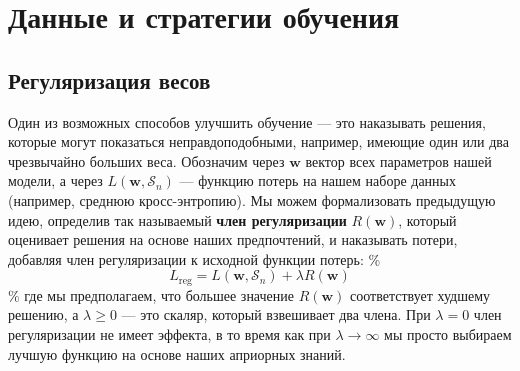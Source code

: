 \section{Данные и стратегии обучения}

\subsection{Регуляризация весов}

Один из возможных способов улучшить обучение — это наказывать решения, которые могут показаться неправдоподобными, например, имеющие один или два чрезвычайно больших веса. Обозначим через $\mathbf{w}$ вектор всех параметров нашей модели, а через $L(\mathbf{w}, \mathcal{S}_n)$ — функцию потерь на нашем наборе данных (например, среднюю кросс-энтропию). Мы можем формализовать предыдущую идею, определив так называемый \textbf{член регуляризации} $R(\mathbf{w})$, который оценивает решения на основе наших предпочтений, и наказывать потери, добавляя член регуляризации к исходной функции потерь:
\%
$$
L_{\text{reg}}=L(\mathbf{w}, \mathcal{S}_n)+\lambda R(\mathbf{w})
$$
\%
где мы предполагаем, что большее значение $R(\mathbf{w})$ соответствует худшему решению, а $\lambda \ge 0$ — это скаляр, который взвешивает два члена. При $\lambda=0$ член регуляризации не имеет эффекта, в то время как при $\lambda \rightarrow \infty$ мы просто выбираем лучшую функцию на основе наших априорных знаний.

